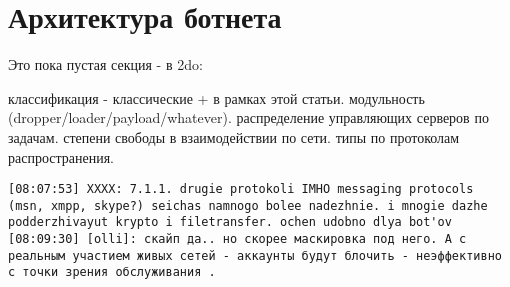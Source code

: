 \section{Архитектура ботнета}

Это пока пустая секция - в 2do:

классификация - классические + в рамках этой статьи.
модульность (dropper/loader/payload/whatever).
распределение управляющих серверов по задачам.
степени свободы в взаимодействии по сети.
типы по протоколам распространения.
\begin{verbatim}
[08:07:53] XXXX: 7.1.1. drugie protokoli IMHO messaging protocols (msn, xmpp, skype?) seichas namnogo bolee nadezhnie. i mnogie dazhe podderzhivayut krypto i filetransfer. ochen udobno dlya bot'ov
[08:09:30] [olli]: скайп да.. но скорее маскировка под него. А с реальным участием живых сетей - аккаунты будут блочить - неэффективно с точки зрения обслуживания .
\end{verbatim}

